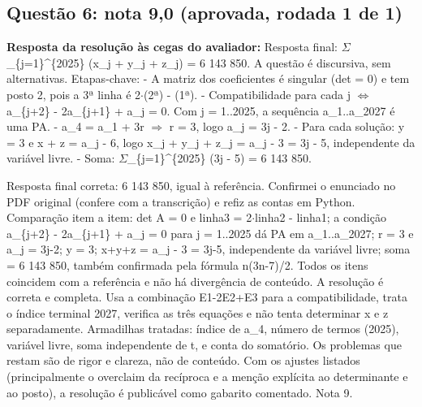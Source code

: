 \documentclass{article}%
\begin{document}
\subsection*{Questão 6: nota 9,0 (aprovada, rodada 1 de 1)}%
\textbf{Resposta da resolução às cegas do avaliador:} Resposta final: $\Sigma$\_\{j=1\}\^{}\{2025\} (x\_j + y\_j + z\_j) = 6 143 850. A questão é discursiva, sem alternativas.\newline%
\newline%
Etapas{-}chave:\newline%
{-} A matriz dos coeficientes é singular (det = 0) e tem posto 2, pois a 3ª linha é 2$\cdot$(2ª) - (1ª).\newline%
{-} Compatibilidade para cada j $\Leftrightarrow$ a\_\{j+2\} - 2a\_\{j+1\} + a\_j = 0. Com j = 1..2025, a sequência a\_1..a\_2027 é uma PA.\newline%
{-} a\_4 = a\_1 + 3r $\Rightarrow$ r = 3, logo a\_j = 3j - 2.\newline%
{-} Para cada solução: y = 3 e x + z = a\_j - 6, logo x\_j + y\_j + z\_j = a\_j - 3 = 3j - 5, independente da variável livre.\newline%
{-} Soma: $\Sigma$\_\{j=1\}\^{}\{2025\} (3j - 5) = 6 143 850.\par %
Resposta final correta: 6 143 850, igual à referência. Confirmei o enunciado no PDF original (confere com a transcrição) e refiz as contas em Python. Comparação item a item: det A = 0 e linha3 = 2$\cdot$linha2 - linha1; a condição a\_\{j+2\} - 2a\_\{j+1\} + a\_j = 0 para j = 1..2025 dá PA em a\_1..a\_2027; r = 3 e a\_j = 3j-2; y = 3; x+y+z = a\_j - 3 = 3j-5, independente da variável livre; soma = 6 143 850, também confirmada pela fórmula n(3n-7)/2. Todos os itens coincidem com a referência e não há divergência de conteúdo. A resolução é correta e completa. Usa a combinação E1-2E2+E3 para a compatibilidade, trata o índice terminal 2027, verifica as três equações e não tenta determinar x e z separadamente. Armadilhas tratadas: índice de a\_4, número de termos (2025), variável livre, soma independente de t, e conta do somatório. Os problemas que restam são de rigor e clareza, não de conteúdo. Com os ajustes listados (principalmente o overclaim da recíproca e a menção explícita ao determinante e ao posto), a resolução é publicável como gabarito comentado. Nota 9.%
\end{document}
